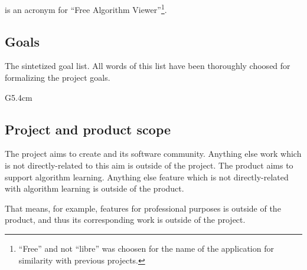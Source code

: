 \documentclass[twocolumn]{article}
\begin{document}

\fav is an acronym for ``Free Algorithm Viewer''\footnote{``Free'' and
not ``libre'' was choosen for the name of the application for similarity
with previous projects.}.

\subsection{Goals}
\label{sec:goals}
The sintetized \favp goal list. All words of this list
have been thoroughly choosed for formalizing the project goals.

\begin{condlist}{G}{5.4cm}
\end{condlist}

\subsection{Project and product scope}
The project aims to create \fav and its software community. Anything
else work which is not directly-related to this aim is outside of the
project. The product aims to support algorithm learning. Anything else
feature which is not directly-related with algorithm learning is
outside of the product.

That means, for example, features for professional purposes is outside
of the product, and thus its corresponding work is outside of the
project.

\end{document}
